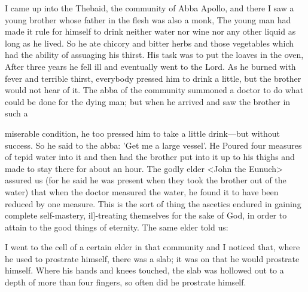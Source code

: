 I came up into the Thebaid, the community of Abba Apollo, and
there I saw a young brother whose father in the flesh was also a
monk, The young man had made it rule for himself to drink neither
water nor wine nor any other liquid as long as he lived.
So he ate
chicory and bitter herbs and those vegetables which had the ability
of assuaging his thirst.
His task was to put the loaves in the oven,
After three years he fell ill and eventually went to the Lord.
As he
burned with fever and terrible thirst, everybody pressed him to drink
a little, but the brother would not hear of it.
The abba of the
community summoned a doctor to do what could be done for the
dying man; but when he arrived and saw the brother in such a

miserable condition, he too pressed him to take a little drink—but
without success.
So he said to the abba: 'Get me a large vessel'.
He
Poured four measures of tepid water into it and then had the
brother put into it up to his thighs and made to stay there for about
an hour.
The godly elder <John the Eunuch> assured us (for he
said he was present when they took the brother out of the water)
that when the doctor measured the water, he found it to have been
reduced by one measure.
This is the sort of thing the ascetics
endured in gaining complete self-mastery, il]-treating themselves for
the sake of God, in order to attain to the good things of eternity.
The same elder told us:

I went to the cell of a certain elder in that community and I noticed
that, where he used to prostrate himself, there was a slab; it was on
that he would prostrate himself.
Where his hands and knees
touched, the slab was hollowed out to a depth of more than four
fingers, so often did he prostrate himself.

